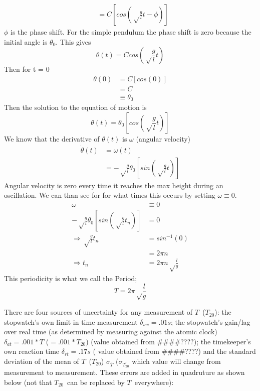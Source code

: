 \documentclass[iop]{emulateapj}
\def\T{$T$}
\def\Ttwen{$T_{20}$}
\def\fillin{\#\#\#\#????}
\begin{document}
\begin{figure*}
\begin{align*}
& = C[cos(\sqrt\frac{g}{l}t - \phi)]
\end{align*}
$\phi$ is the phase shift. For the simple pendulum the phase shift is zero 
because the initial angle is $\theta_0$. This gives\\
\begin{equation*}
\theta(t) = Ccos(\sqrt\frac{g}{l}t)
\end{equation*}
Then for t = 0
\begin{align*}
\theta(0) & = C[cos(0)]\\
& = C\\
& \equiv \theta_0
\end{align*}
Then the solution to the equation of motion is
\begin{equation}
\boxed{\theta(t) = \theta_0[cos(\sqrt\frac{g}{l}t)]}
\end{equation}
We know that the derivative of $\theta(t)$ is $\omega$ (angular velocity)
\begin{align*}
\dot{\theta}(t) & = \omega(t)\\
& = -\sqrt\frac{g}{l}\theta_0[sin(\sqrt\frac{g}{l}t)]
\end{align*}
Angular velocity is zero every time it reaches the max height during an oscillation. We can than see for
for what times this occurs by setting $\omega \equiv 0$.
\begin{align*}
\omega & \equiv 0\\
-\sqrt\frac{g}{l}\theta_0[sin(\sqrt\frac{g}{l}t_n)] & = 0\\
\Rightarrow \sqrt\frac{g}{l}t_n & = sin^{-1}(0)\\
& = 2\pi n\\
\Rightarrow t_n & = 2\pi n\sqrt\frac{l}{g}
\end{align*}
This periodicity is what we call the Period;
\begin{equation}
\boxed{T = 2\pi \sqrt\frac{l}{g}}
\end{equation}


There are four sources of uncertainty for any measurement of \T\ (\Ttwen): 
the stopwatch's own limit in time measurement 
$\delta_{sw} = .01s$; the stopwatch's gain/lag over real time (as determined 
by measuring against the atomic clock) $\delta_{at} = .001*T$ ($=.001*T_{20}$) 
(value obtained 
from \fillin); the timekeeper's own reaction time $\delta_{rt} = .17s$ (
value obtained from \fillin) and the standard deviation of the mean of \T\ 
(\Ttwen) $\sigma_{\overbar{T}}$ ($\sigma_{\overbar{T_{20}}}$ which value will 
change from measurement to measurement.  These errors are added in quadruture 
as shown below (not that \Ttwen\ can be replaced by \T\ everywhere):


\end{figure*}
\end{document}

